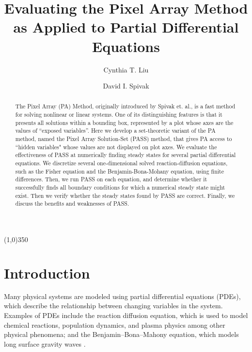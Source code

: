 \documentclass[11pt]{article}
\begin{document}
\title{Evaluating the Pixel Array Method as Applied to Partial Differential Equations}
\author[1]{Cynthia T. Liu}
\author[2]{David I. Spivak}
\date{}

\maketitle

\begin{abstract}
The Pixel Array (PA) Method, originally introduced by Spivak et. al., is a fast method for solving nonlinear or linear systems. One of its distinguishing features is that it presents all solutions within a bounding box, represented by a plot whose axes are the values of ``exposed variables''. Here we develop a set-theoretic variant of the PA method, named the Pixel Array Solution-Set (PASS) method, that gives PA access to ``hidden variables" whose values are not displayed on plot axes. We evaluate the effectiveness of PASS at numerically finding steady states for several partial differential equations. We discretize several one-dimensional solved reaction-diffusion equations, such as the Fisher equation and the Benjamin-Bona-Mohany equation, using finite differences. Then, we run PASS on each equation, and determine whether it successfully finds all boundary conditions for which a numerical steady state might exist. Then we verify whether the steady states found by PASS are correct. Finally, we discuss the benefits and weaknesses of PASS.
\end{abstract}

\begin{center}
\line(1,0){350}
\end{center}

\section{Introduction}

Many physical systems are modeled using partial differential equations (PDEs), which describe the relationship between changing variables in the system. Examples of PDEs include the reaction diffusion equation, which is used to model chemical reactions, population dynamics, and plasma physics among other physical phenomena; and the Benjamin–Bona–Mahony equation, which models long surface gravity waves \citep{BBM}.
\end{document}

